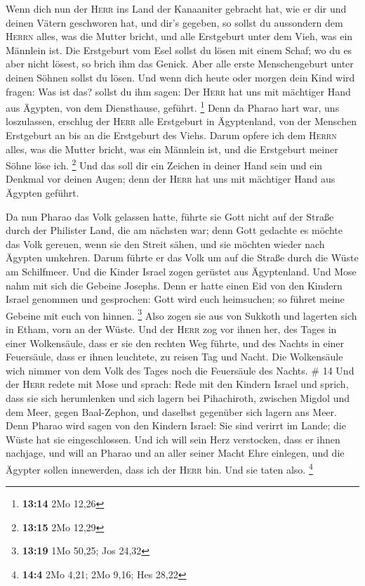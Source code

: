  Wenn dich nun der \textsc{Herr} ins Land der Kanaaniter
gebracht hat, wie er dir und deinen Vätern geschworen hat, und dir's
gegeben,  so sollst du aussondern dem \textsc{Herrn}
alles, was die Mutter bricht, und alle Erstgeburt unter dem Vieh, was
ein Männlein ist.  Die Erstgeburt vom Esel sollst du
lösen mit einem Schaf; wo du es aber nicht lösest, so brich ihm das
Genick. Aber alle erste Menschengeburt unter deinen Söhnen sollst du
lösen.  Und wenn dich heute oder morgen dein Kind wird
fragen: Was ist das? sollst du ihm sagen: Der \textsc{Herr} hat uns mit
mächtiger Hand aus Ägypten, von dem Diensthause, geführt. \footnote{\textbf{13:14}
  2Mo 12,26}  Denn da Pharao hart war, uns loszulassen,
erschlug der \textsc{Herr} alle Erstgeburt in Ägyptenland, von der
Menschen Erstgeburt an bis an die Erstgeburt des Viehs. Darum opfere ich
dem \textsc{Herrn} alles, was die Mutter bricht, was ein Männlein ist,
und die Erstgeburt meiner Söhne löse ich. \footnote{\textbf{13:15} 2Mo
  12,29}  Und das soll dir ein Zeichen in deiner Hand
sein und ein Denkmal vor deinen Augen; denn der \textsc{Herr} hat uns
mit mächtiger Hand aus Ägypten geführt.

 Da nun Pharao das Volk gelassen hatte, führte sie Gott
nicht auf der Straße durch der Philister Land, die am nächsten war; denn
Gott gedachte es möchte das Volk gereuen, wenn sie den Streit sähen, und
sie möchten wieder nach Ägypten umkehren.  Darum führte
er das Volk um auf die Straße durch die Wüste am Schilfmeer. Und die
Kinder Israel zogen gerüstet aus Ägyptenland.  Und Mose
nahm mit sich die Gebeine Josephs. Denn er hatte einen Eid von den
Kindern Israel genommen und gesprochen: Gott wird euch heimsuchen; so
führet meine Gebeine mit euch von hinnen. \footnote{\textbf{13:19} 1Mo
  50,25; Jos 24,32}  Also zogen sie aus von Sukkoth und
lagerten sich in Etham, vorn an der Wüste.  Und der
\textsc{Herr} zog vor ihnen her, des Tages in einer Wolkensäule, dass er
sie den rechten Weg führte, und des Nachts in einer Feuersäule, dass er
ihnen leuchtete, zu reisen Tag und Nacht.  Die
Wolkensäule wich nimmer von dem Volk des Tages noch die Feuersäule des
Nachts. \# 14  Und der \textsc{Herr} redete mit Mose und
sprach:  Rede mit den Kindern Israel und sprich, dass sie
sich herumlenken und sich lagern bei Pihachiroth, zwischen Migdol und
dem Meer, gegen Baal-Zephon, und daselbst gegenüber sich lagern ans
Meer.  Denn Pharao wird sagen von den Kindern Israel: Sie
sind verirrt im Lande; die Wüste hat sie eingeschlossen. 
Und ich will sein Herz verstocken, dass er ihnen nachjage, und will an
Pharao und an aller seiner Macht Ehre einlegen, und die Ägypter sollen
innewerden, dass ich der \textsc{Herr} bin. Und sie taten also.
\footnote{\textbf{14:4} 2Mo 4,21; 2Mo 9,16; Hes 28,22}

